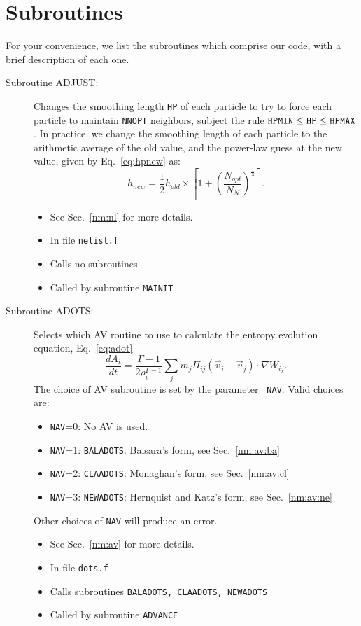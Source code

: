 \newpage
\section{Subroutines}
\label{su}
For your convenience, we list the subroutines which comprise our code,
with a brief description of each one.

\begin{description}
\item[Subroutine ADJUST:] Changes the smoothing length {\tt HP} of each
particle to try to force 
each particle to maintain {\tt NNOPT} neighbors, subject the rule
${\tt HPMIN} \le {\tt HP} \le {\tt HPMAX}$.  In practice, we change the
smoothing length of each particle to the arithmetic average of the old
value, and the power-law guess at the new value, given by
Eq.~\ref{eq:hpnew} as: 
\begin{equation}
h_{new}=\frac{1}{2}h_{old}\times\left
[1+\left(\frac{N_{opt}}{N_N}\right)^{\frac{1}{3}}\right].
\end{equation}
\begin{itemize} 
\item See Sec.~\ref{nm:nl} for more details.
\item In file {\tt nelist.f}
\item Calls no subroutines
\item Called by subroutine {\tt MAINIT}
\end{itemize}

\item[Subroutine ADOTS:] Selects which AV routine to use to calculate
the entropy evolution equation, Eq.~\ref{eq:adot}
\begin{equation}
\frac{dA_i}{dt}=\frac{\Gamma-1}{2\rho_i^{\Gamma-1}}\sum_j m_j \Pi_{ij}
(\vec{v}_i-\vec{v}_j)\cdot \nabla W_{ij}.
\end{equation}
The choice of AV subroutine is set by the parameter {\tt
NAV}.  Valid choices are:
\begin{itemize}
\item {\tt NAV}=0: No AV is used.
\item {\tt NAV}=1: {\tt BALADOTS}: Balsara's form, see Sec.~\ref{nm:av:ba}
\item {\tt NAV}=2: {\tt CLAADOTS}: Monaghan's form, see Sec.~\ref{nm:av:cl}
\item {\tt NAV}=3: {\tt NEWADOTS}: Hernquist and Katz's form, see
Sec.~\ref{nm:av:ne} 
\end{itemize}
Other choices of {\tt NAV} will produce an error.
\begin{itemize} 
\item See Sec.~\ref{nm:av} for more details.
\item In file {\tt dots.f}
\item Calls subroutines {\tt BALADOTS, CLAADOTS, NEWADOTS}
\item Called by subroutine {\tt ADVANCE}
\end{itemize}


\end{description}
